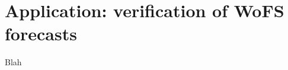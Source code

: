 \documentclass{ametsoc}
\begin{document}
\section{Application: verification of WoFS forecasts}
Blah








\acknowledgments







%
%
%
 \appendix[A] 

\printnomenclature[6em]
\end{document}
